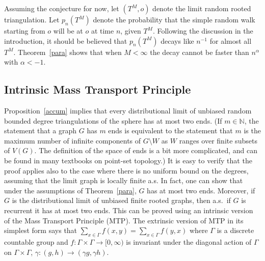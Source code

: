 \documentclass[12pt,naturalnames]{article}
\numberwithin{equation}{section}
\numberwithin{figure}{section}
\numberwithin{theorem}{section}
\newcommand{\N}{\mathbb{N}}
\def\oHmtp{MR98f:60207}
\def\BLPSgip{MR99m:60149}
\begin{document}
Assuming the conjecture for now, let $(T^M,o)$ denote the limit random rooted
triangulation.  Let $p_n(T^M)$ denote the probability that the simple random
walk starting from $o$ will be at $o$ at time $n$, given $T^M$.  Following
the discussion in the introduction, it should be believed that $p_n(T^M)$
decays like $n^{-1}$ for almost all $T^M$.
Theorem~\ref{para} shows that when $M<\infty$
the decay cannot be faster than $n^{\alpha}$ with $\alpha<-1$.

\subsection{Intrinsic Mass Transport Principle}

Proposition~\ref{accum} implies that every distributional limit
of unbiased random bounded degree triangulations
of the sphere has at most two ends.
(If $m\in\N$, the statement that a graph $G$ has $m$ ends
is equivalent to the statement that $m$ is the maximum
number of infinite components of $G\setminus W$ as
$W$ ranges over finite subsets of $V(G)$.
The definition of the space of ends is a bit more complicated, and
can be found in many textbooks on point-set topology.)
It is easy to verify that the proof applies also
to the case where there is no uniform bound on the degrees, assuming
that the limit graph is locally finite a.s. 
In fact, one can show that under the assumptions of Theorem~\ref{para},
$G$ has at most two ends.  Moreover, if $G$ is
the distributional limit of unbiased finite rooted graphs,
then a.s.~if $G$ is recurrent it has at most two ends. 
This can be proved using an intrinsic
version of the Mass Transport Principle (MTP).
The extrinsic version of MTP \cite{\oHmtp,\BLPSgip} in its simplest
form says that $\sum_{x\in \Gamma} f(x,y)=\sum_{x\in \Gamma} f(y,x)$ where
$\Gamma$ is a discrete countable group and
$f:\Gamma\times \Gamma\to[0,\infty)$ is invariant under
the diagonal action of $\Gamma$ on $\Gamma\times\Gamma$,
$\gamma:(g,h)\to (\gamma g,\gamma h)$.
\end{document}
